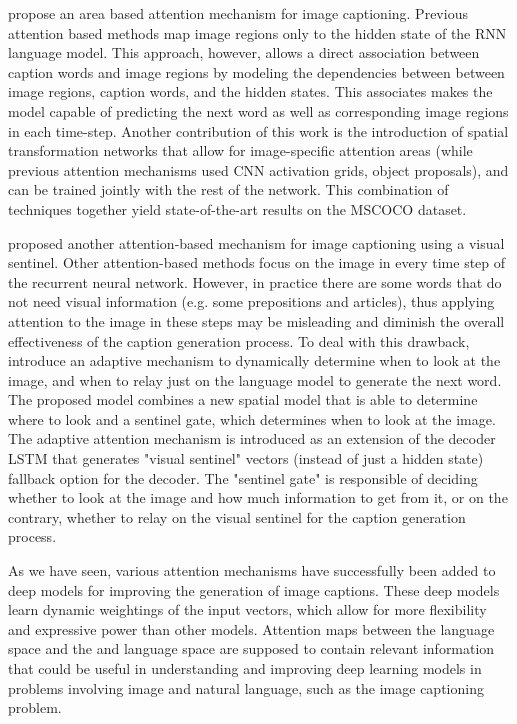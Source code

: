 \citet{Pedersoli2017} propose an area based attention mechanism for image captioning. Previous attention based methods map image regions only to the hidden state of the RNN language model. This approach, however, allows a direct association between caption words and image regions by modeling the dependencies between between image regions, caption words, and the hidden states. This associates makes the model capable of predicting the next word as well as corresponding image regions in each time-step. Another contribution of this work is the introduction of spatial transformation networks that allow for image-specific attention areas (while previous attention mechanisms used CNN activation grids, object proposals), and can be trained jointly with the rest of the network. This combination of techniques together yield state-of-the-art results on the MSCOCO dataset.

\citet{Lu2017} proposed another attention-based mechanism for image captioning using a visual sentinel. Other attention-based methods focus on the image in every time step of the recurrent neural network. However, in practice there are some words that do not need visual information (e.g. some prepositions and articles), thus applying attention to the image in these steps may be misleading and diminish the overall effectiveness of the caption generation process. To deal with this drawback, \citeauthor{Lu2017} introduce an adaptive mechanism to dynamically determine when to look at the image, and when to relay just on the language model to generate the next word. The proposed model combines a new spatial model that is able to determine where to look and a sentinel gate, which determines when to look at the image. The adaptive attention mechanism is introduced as an extension of the decoder LSTM that generates "visual sentinel" vectors (instead of just a hidden state) fallback option for the decoder. The "sentinel gate" is responsible of deciding whether to look at the image and how much information to get from it, or on the contrary, whether to relay on the visual sentinel for the caption generation process.

As we have seen, various attention mechanisms have successfully been added to deep models for improving the generation of image captions. These deep models learn dynamic weightings of the input vectors, which allow for more flexibility and expressive power than other models. Attention maps between the language space and the and language space are supposed to contain relevant information that could be useful in understanding and improving deep learning models in problems involving image and natural language, such as the image captioning problem. 

